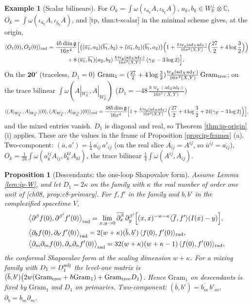 \documentclass[11pt]{report}
\theoremstyle{plain}
\newtheorem{proposition}[theorem]{Proposition}
\theoremstyle{definition}
\newtheorem{example}[theorem]{Example}
\numberwithin{equation}{chapter}
\newcommand{\unit}{\tfrac{\hbar\operatorname{tr}_{\mathfrak g}(\mathrm{ad}_X\mathrm{ad}_Y)}{16\pi^2(X,Y)}}
\newcommand{\Wp}{W_{\mathbb R}^\perp}
\newcommand{\Gt}{\mathrm{Gram}_{\rm tree}}
\newcommand{\Go}{\mathrm{Gram}_{1}}
\newcommand{\rad}{{\rm rad}}
\newcommand{\Ko}{(A|_{\Wp},A|_{\Wp})}
\begin{document}
\begin{example}[Scalar bilinears]
\label{ex:ip-scalars}
For $O_k=\int\omega(\iota_{a_k}A,\iota_{b_k}A)$, $a_k,b_k\in\Wp\otimes\mathbb C$, $\overline{O_k}=\int\omega(\iota_{\overline{a_k}}A,\iota_{\overline{b_k}}A)$, and [tp, thm:t-scalar] in the minimal scheme gives, at the origin,
\[
\begin{aligned}
\langle O_1(0),O_2(0)\rangle_\rad={}&\frac{4\hbar\dim\mathfrak g}{16\pi^4}\Big[\big((\overline{a_1},a_2)(\overline{b_1},b_2)+(\overline{a_1},b_2)(\overline{b_1},a_2)\big)\Big(1+\unit\Big(\frac{27}2+4\log\frac32\Big)\Big)\\
&\qquad+8\,(\overline{a_1},\overline{b_1})(a_2,b_2)\,\unit\,(\gamma_E-3\log2)\Big].
\end{aligned}
\]
On the $\mathbf{20'}$ (traceless, $D_1=0$) $\Go=(\tfrac{27}2+4\log\tfrac32)\frac{\operatorname{tr}_{\mathfrak g}(\mathrm{ad}_X\mathrm{ad}_Y)}{16\pi^2(X,Y)}\,\Gt$; on the trace bilinear $\int\omega\Ko$ ($D_1=-48\,\unit$)
\[
\langle\Ko(0),\Ko(0)\rangle_\rad=\frac{48\hbar\dim\mathfrak g}{16\pi^4}\Big[1+\unit\Big(\frac{27}2+4\log\frac32+24(\gamma_E-3\log2)\Big)\Big],
\]
and the mixed entries vanish. $D_1$ is diagonal and real, so Theorem \ref{thm:ip-origin} (i) applies. These are the values in the frame of Proposition \ref{prop:ip-frames} (a). Two-component: $(\overline a,a')=\tfrac14\,\overline{a_{ij}}\,a'_{ij}$ (on the real slice $\overline{A_{ij}}=A^{ij}$, so $\overline a{}^{ij}=\overline{a_{ij}}$), $O_k=\tfrac1{16}\int\omega(a_k^{ij}A_{ij},b_k^{kl}A_{kl})$, the trace bilinear $\tfrac14\int\omega(A^{ij},A_{ij})$.
\end{example}

\begin{proposition}[Descendants: the one-loop Shapovalov form]
\label{prop:ip-desc}
Assume Lemma \ref{lem:ip-W}, and let $D_1=2\kappa$ on the family with $\kappa$ the real number of order one unit of [ch08, prop:c8-primary]. For $f,f'$ in the family and $b,b'$ in the complexified spacetime $V$,
\[
\begin{aligned}
&\big\langle\partial^\beta f(0),\partial^{\beta'}f'(0)\big\rangle_\rad=\lim_{x,y\to0}\overline{\partial_x^{\beta}}\,\partial_y^{\beta'}\Big[(x,x)^{-w-\kappa}\langle\overline f,f'\rangle(I(x)-y)\Big],\\
&\big\langle\partial_bf(0),\partial_{b'}f'(0)\big\rangle_\rad=2(w+\kappa)(\overline b,b')\,\langle f(0),f'(0)\rangle_\rad,\\
&\big\langle\partial_m\partial_mf(0),\partial_n\partial_nf'(0)\big\rangle_\rad=32(w+\kappa)(w+\kappa-1)\,\langle f(0),f'(0)\rangle_\rad ,
\end{aligned}
\]
the conformal Shapovalov form at the scaling dimension $w+\kappa$. For a mixing family with $D_1=D_1^{\rm adj}$ the level-one matrix is $(\overline b,b')\big(2w(\Gt+\hbar\Go)+\Gt D_1\big)$. Hence $\Go$ on descendants is fixed by $\Go$ and $D_1$ on primaries. Two-component: $(\overline b,b')=\overline{b_m}\,b'_m$, $\partial_b=b_m\partial_m$.
\end{proposition}
\end{document}
